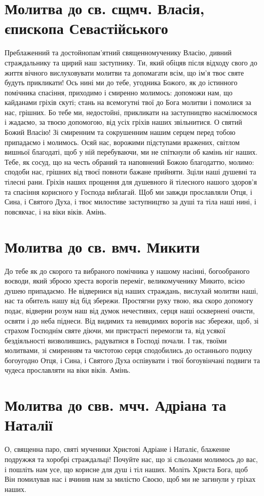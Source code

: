 \documentclass[chapters.tex]{subfiles}
\begin{document}
\section{Молитва до св. сщмч. Власія, єпископа Севастійського}
Преблаженний та достойнопам’ятний священномученику Власію, дивний страждальнику та щирий наш заступнику. Ти, який обіцяв після відходу свого до життя вічного вислуховувати молитви та допомагати всім, що ім’я твоє святе будуть прикликати! Ось нині ми до тебе, угодника Божого, як до істинного помічника спасіння, приходимо і смиренно молимось: допоможи нам, що кайданами гріхів скуті; стань на всемогутні твої до Бога молитви і помолися за нас, грішних. Бо тебе ми, недостойні, прикликати на заступництво насмілюємося і жадаємо, за твоєю допомогою, від усіх гріхів наших звільнитися. О святий Божий Власію! Зі смиренним та сокрушенним нашим серцем перед тобою припадаємо і молимось. Осяй нас, ворожими підступами вражених, світлом вишньої благодаті, щоб у ній перебуваючи, ми не спіткнули об камінь ніг наших. Тебе, як сосуд, що на честь обраний та наповнений Божою благодаттю, молимо: сподоби нас, грішних від твоєї повноти бажане прийняти. Зціли наші душевні та тілесні рани. Гріхів наших прощення для душевного й тілесного нашого здоров’я та спасіння корисного у Господа виблагай. Щоб ми завжди прославляли Отця, і Сина, і Святого Духа, і твоє милостиве заступництво за душі та тіла наші нині, і повсякчас, і на віки віків. Амінь.

\section{Молитва до св. вмч. Микити}
До тебе як до скорого та вибраного помічника у нашому насінні, богообраного воєводи, який зброєю хреста ворогів переміг, великомученику Микито, всією душею припадаємо. Не відвернися від наших страждань, вислухай молитви наші, нас та обитель нашу від бід збережи. Простягни руку твою, яка скоро допомогу подає, відверни розум наш від думок нечестивих, серця наші осквернені очисти, освяти і до неба піднеси. Від видимих та невидимих ворогів нас збережи, щоб, зі страхом Господнім святе діючи, ми пристрасті перемогли та, від усякої бездіяльності визволившись, радуватися в Господі почали. І так, твоїми молитвами, зі смиренням та чистотою серця сподобились до останнього подиху богоугодно Отця, і Сина, і Святого Духа оспівувати і твої богоувінчані подвиги та чудеса прославляти на віки віків. Амінь.

\section{Молитва до свв. мчч. Адріана та Наталії}
О, священна паро, святі мученики Христові Адріане і Наталіє, блаженне подружжя та хоробрі страждальці! Почуйте нас, що зі сльозами молимось до вас, і пошліть нам усе, що корисне для душ і тіл наших. Моліть Христа Бога, щоб Він помилував нас і вчинив нам за милістю Своєю, щоб ми не загинули у гріхах наших.
\end{document}
